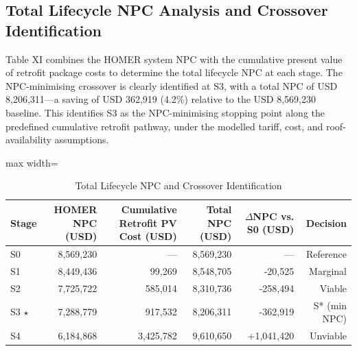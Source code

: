 \documentclass[journal,fleqn]{IEEEtran}
\renewcommand{\arraystretch}{1.08}
\begin{document}
\subsection{Total Lifecycle NPC Analysis and Crossover Identification}

Table XI combines the HOMER system NPC with the cumulative present value of retrofit package costs to determine the total lifecycle NPC at each stage. The NPC-minimising crossover is clearly identified at S3, with a total NPC of USD 8,206,311---a saving of USD 362,919 (4.2\%) relative to the USD 8,569,230 baseline. This identifies S3 as the NPC-minimising stopping point along the predefined cumulative retrofit pathway, under the modelled tariff, cost, and roof-availability assumptions.


\begin{table}[!t]
\caption{Total Lifecycle NPC and Crossover Identification}
\label{tab:11}
\centering
\scriptsize
\setlength{\tabcolsep}{4pt}
\renewcommand{\arraystretch}{1.16}
\begin{adjustbox}{max width=\textwidth}
\begin{tabular}{@{}lrrrrr@{}}
\toprule
\textbf{Stage} & \textbf{HOMER NPC (USD)} & \textbf{Cumulative Retrofit PV Cost (USD)} & \textbf{Total NPC (USD)} & \textbf{$\Delta$NPC vs. S0 (USD)} & \textbf{Decision} \\
\midrule
S0 & 8,569,230 & --- & 8,569,230 & --- & Reference \\
S1 & 8,449,436 & 99,269 & 8,548,705 & -20,525 & Marginal \\
S2 & 7,725,722 & 585,014 & 8,310,736 & -258,494 & Viable \\
S3 $\star$ & 7,288,779 & 917,532 & 8,206,311 & -362,919 & S* (min NPC) \\
S4 & 6,184,868 & 3,425,782 & 9,610,650 & +1,041,420 & Unviable \\
\bottomrule
\end{tabular}
\end{adjustbox}
\end{table}
\end{document}
